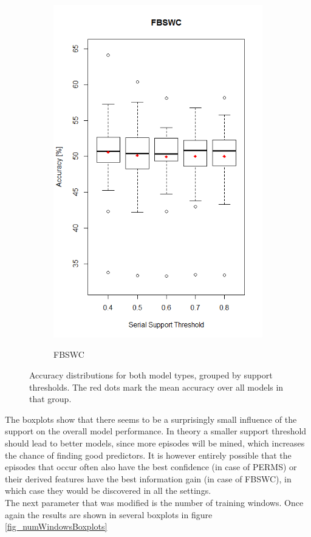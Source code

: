 \begin{figure}[h]
\begin{subfigure}{.5\textwidth}
  \includegraphics[width=\linewidth]{fbswcSupportSerial}
  \label{fig_fbswcSupportSerial}
  \caption{FBSWC}
\end{subfigure}
\caption{Accuracy distributions for both model types, grouped by support thresholds. The red dots mark the mean accuracy over all models in that group.}
\label{fig_supportBoxplots}
\end{figure}

The boxplots show that there seems to be a surprisingly small influence of the support on the overall model performance. In theory a smaller support threshold should lead to better models, since more episodes will be mined, which increases the chance of finding good predictors. It is however entirely possible that the episodes that occur often also have the best confidence (in case of PERMS) or their derived features have the best information gain (in case of FBSWC), in which case they would be discovered in all the settings. \\
The next parameter that was modified is the number of training windows. Once again the results are shown in several boxplots in figure \ref{fig_numWindowsBoxplots}

